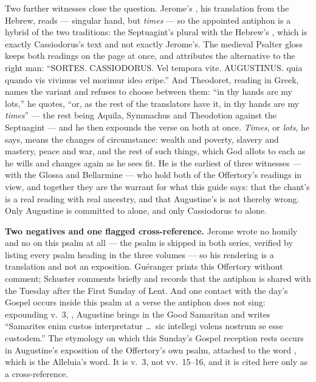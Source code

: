 Two further witnesses close the question. Jerome's , his translation from the Hebrew, reads  --- singular hand, but \textit{times} --- so the appointed antiphon is a
hybrid of the two traditions: the Septuagint's plural 
with the Hebrew's , which is exactly Cassiodorus's text and not
exactly Jerome's. The medieval Psalter gloss keeps both readings on the page at
once, and attributes the alternative to the right man: ``SORTES. CASSIODORUS.
Vel tempora vite. AUGUSTINUS. quia quando vis vivimus vel morimur ideo eripe.''
And Theodoret, reading in Greek, names the variant and refuses to choose
between them: ``in thy hands are my lots,'' he quotes, ``or,
as the rest of the translators have it, in thy hands are my \emph{times}'' ---
the rest being Aquila, Symmachus and Theodotion against the Septuagint --- and
he then expounds the verse on both at once. \textit{Times}, or \textit{lots},
he says, means the changes of circumstance: wealth and poverty, slavery and
mastery, peace and war, and the rest of such things, which God allots to each
as he wills and changes again as he sees fit. He is the earliest of three witnesses ---
with the Glossa and Bellarmine --- who hold both of the Offertory's readings in
view, and together they are the warrant for what this guide says: that the
chant's  is a real reading with real ancestry, and that
Augustine's  is not thereby wrong. Only Augustine is committed to
 alone, and only Cassiodorus to  alone.

\textbf{Two negatives and one flagged cross-reference.} Jerome wrote no homily
and no  on this psalm at all --- the psalm is skipped in
both series, verified by listing every psalm heading in the three volumes ---
so his  rendering is a translation and not an exposition.
Guéranger prints this Offertory without comment; Schuster comments briefly and
records that the antiphon is shared with the Tuesday after the First Sunday of
Lent. And one contact with the day's Gospel occurs inside this psalm at a verse
the antiphon does not sing: expounding v.~3, , Augustine brings in the Good Samaritan and writes ``Samarites enim
custos interpretatur \dots\ sic intellegi volens nostrum se esse custodem.''
The etymology on which this Sunday's Gospel reception rests occurs in
Augustine's exposition of the Offertory's own psalm, attached to the word
, which is the Alleluia's word. It is v.~3, not vv.~15--16, and
it is cited here only as a cross-reference.

